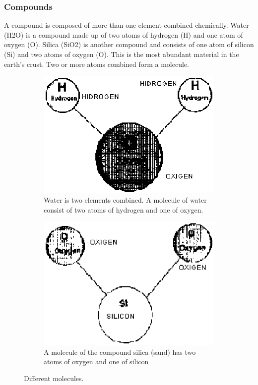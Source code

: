 \subsubsection{Compounds}
A compound is composed of more than one element combined chemically. Water 
(H2O) is a compound made up of two atoms of hydrogen (H) and one atom of oxygen 
(O). Silica (SiO2) is another compound and consists of one atom of silicon (Si) 
and two atoms of oxygen (O). This is the most abundant material in the earth's 
crust. Two or more atoms combined form a molecule.
\begin{figure}[htbp!]
\centering
\begin{subfigure}{.45\textwidth}
\centering
\includegraphics[width=1\linewidth]{img/molecule1.eps}
\caption{Water is two elements combined. A molecule of water consist of two 
atoms of hydrogen and one of oxygen.}
\label{fig:molecule1}
\end{subfigure}%
\hfill
\begin{subfigure}{.45\textwidth}
\centering
\includegraphics[width=1\linewidth]{img/molecule2.eps}
\caption{A molecule of the compound silica (sand) has two atoms of oxygen and 
one of silicon}
\label{fig:molecule2}
\end{subfigure}
\caption{Different molecules.}
\label{fig:molecules}
\end{figure}
